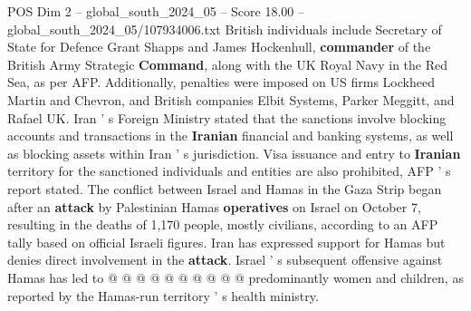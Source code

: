 \begin{textsample}{POS Dim 2 – global\_south\_2024\_05 – Score 18.00 – global\_south\_2024\_05/107934006.txt}
British individuals include Secretary of State for Defence Grant Shapps and James Hockenhull, \textbf{commander} of the British Army Strategic \textbf{Command}, along with the UK Royal Navy in the Red Sea, as per AFP.
Additionally, penalties were imposed on US firms Lockheed Martin and Chevron, and British companies Elbit Systems, Parker Meggitt, and Rafael UK.
Iran ' s Foreign Ministry stated that the sanctions involve blocking accounts and transactions in the \textbf{Iranian} financial and banking systems, as well as blocking assets within Iran ' s jurisdiction.
Visa issuance and entry to \textbf{Iranian} territory for the sanctioned individuals and entities are also prohibited, AFP ' s report stated.
The conflict between Israel and Hamas in the Gaza Strip began after an \textbf{attack} by Palestinian Hamas \textbf{operatives} on Israel on October 7, resulting in the deaths of 1,170 people, mostly civilians, according to an AFP tally based on official Israeli figures.
Iran has expressed support for Hamas but denies direct involvement in the \textbf{attack}.
Israel ' s subsequent offensive against Hamas has led to @ @ @ @ @ @ @ @ @ @ predominantly women and children, as reported by the Hamas-run territory ' s health ministry.

\end{textsample}
